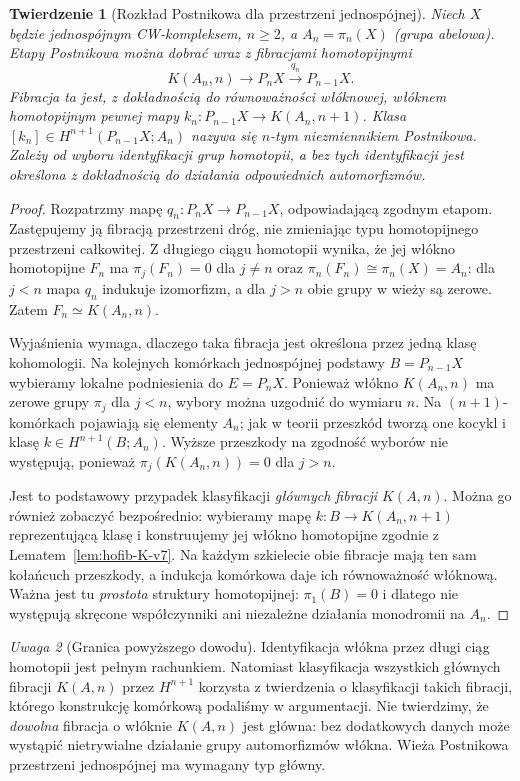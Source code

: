 \documentclass[11pt,a4paper,oneside]{report}
\theoremstyle{plain}
\newtheorem{twierdzenie}{Twierdzenie}[section]
\theoremstyle{definition}
\theoremstyle{remark}
\newtheorem{uwaga}[twierdzenie]{Uwaga}
\begin{document}
\begin{twierdzenie}[Rozkład Postnikowa dla przestrzeni jednospójnej]
\label{thm:postnikov-k-v7}
Niech $X$ będzie jednospójnym CW-kompleksem, $n\ge2$,
a $A_n=\pi_n(X)$ (grupa abelowa). Etapy Postnikowa
można dobrać wraz z fibracjami homotopijnymi
\[
K(A_n,n)\longrightarrow P_nX\xrightarrow{q_n}P_{n-1}X.
\]
Fibracja ta jest, z dokładnością do równoważności
włóknowej, włóknem homotopijnym pewnej mapy
\(k_n:P_{n-1}X\to K(A_n,n+1)\).
Klasa $[k_n]\in H^{n+1}(P_{n-1}X;A_n)$
nazywa się \emph{$n$-tym niezmiennikiem Postnikowa}.
Zależy od wyboru identyfikacji grup homotopii,
a bez tych identyfikacji jest określona z dokładnością
do działania odpowiednich automorfizmów.
\end{twierdzenie}
\begin{proof}
Rozpatrzmy mapę $q_n:P_nX\to P_{n-1}X$,
odpowiadającą zgodnym etapom. Zastępujemy ją fibracją
przestrzeni dróg, nie zmieniając typu homotopijnego
przestrzeni całkowitej. Z długiego ciągu homotopii
wynika, że jej włókno homotopijne $F_n$ ma
$\pi_j(F_n)=0$ dla $j\ne n$ oraz
$\pi_n(F_n)\cong\pi_n(X)=A_n$: dla $j<n$
mapa $q_n$ indukuje izomorfizm, a dla $j>n$
obie grupy w wieży są zerowe. Zatem
$F_n\simeq K(A_n,n)$.

Wyjaśnienia wymaga, dlaczego taka fibracja jest określona
przez jedną klasę kohomologii. Na kolejnych komórkach
jednospójnej podstawy $B=P_{n-1}X$ wybieramy lokalne
podniesienia do $E=P_nX$. Ponieważ włókno
$K(A_n,n)$ ma zerowe grupy $\pi_j$ dla $j<n$,
wybory można uzgodnić do wymiaru $n$. Na
$(n+1)$-komórkach pojawiają się elementy $A_n$;
jak w teorii przeszkód tworzą one kocykl i klasę
$k\in H^{n+1}(B;A_n)$. Wyższe przeszkody
na zgodność wyborów nie występują, ponieważ
$\pi_j(K(A_n,n))=0$ dla $j>n$.

Jest to podstawowy przypadek klasyfikacji \emph{głównych
fibracji $K(A,n)$}. Można go również zobaczyć
bezpośrednio: wybieramy mapę $k:B\to K(A_n,n+1)$
reprezentującą klasę i konstruujemy jej włókno
homotopijne zgodnie z Lematem~\ref{lem:hofib-K-v7}.
Na każdym szkielecie obie fibracje mają ten sam
kołańcuch przeszkody, a indukcja komórkowa daje
ich równoważność włóknową. Ważna jest tu \emph{prostota}
struktury homotopijnej: $\pi_1(B)=0$ i dlatego
nie występują skręcone współczynniki ani niezależne
działania monodromii na $A_n$.
\end{proof}

\begin{uwaga}[Granica powyższego dowodu]
Identyfikacja włókna przez długi ciąg homotopii jest
pełnym rachunkiem. Natomiast klasyfikacja wszystkich
głównych fibracji $K(A,n)$ przez $H^{n+1}$ korzysta
z twierdzenia o klasyfikacji takich fibracji, którego
konstrukcję komórkową podaliśmy w argumentacji.
Nie twierdzimy, że \emph{dowolna} fibracja o włóknie
$K(A,n)$ jest główna: bez dodatkowych danych może
wystąpić nietrywialne działanie grupy automorfizmów
włókna. Wieża Postnikowa przestrzeni jednospójnej
ma wymagany typ główny.
\end{uwaga}
\end{document}
